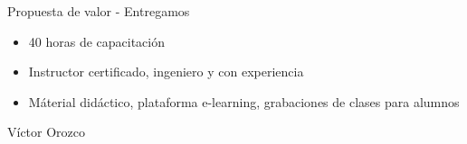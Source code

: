 \documentclass[aspectratio=169]{beamer}
\begin{document}
\begin{frame}[fragile]{Propuesta de valor - Entregamos}
	\begin{itemize}
		\item 40 horas de capacitación
		\item Instructor certificado, ingeniero y con experiencia
		\item Máterial didáctico, plataforma e-learning, grabaciones de clases para alumnos
	\end{itemize}	
\end{frame}

\begin{frame}{Víctor Orozco}
\begin{columns}[T] %
	
	\begin{column}[T]{4cm} %
		\begin{figure}
			\centering

\end{figure}
\end{column}
\end{columns}
\end{frame}
\end{document}
